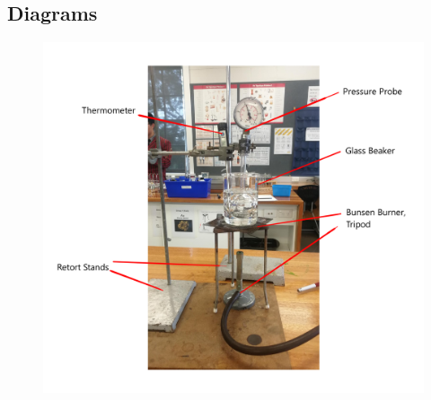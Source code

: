 \documentclass[a4paper,12pt]{article}
\begin{document}
\subsection{Diagrams}


\begin{figure}[H]
    \centering
    \includegraphics[width=\textwidth]{assets/setuplabelled.png}
    \label{fig:setup}
\end{figure}
\end{document}
